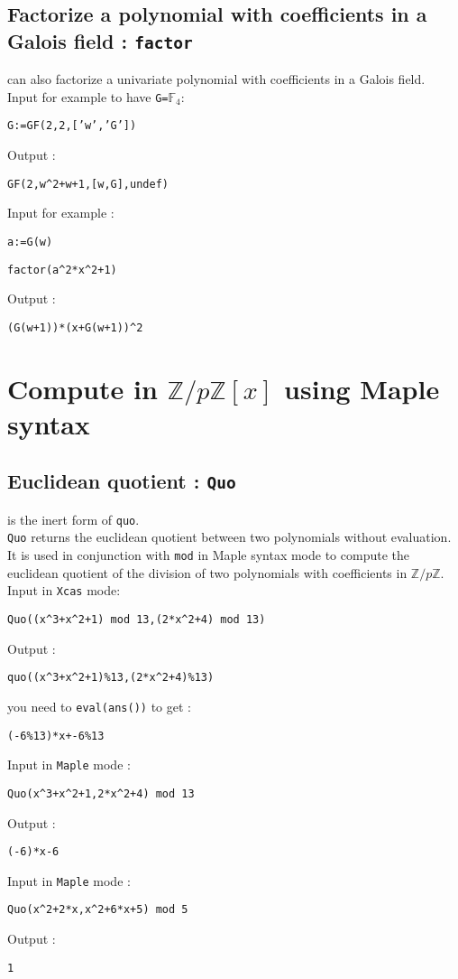 \documentclass[a4paper,11pt]{book}
\newcommand{\Z}{{\mathbb{Z}}}
\begin{document}
\subsection{Factorize a polynomial with coefficients in a Galois field : {\tt factor}}
 can also factorize a univariate
polynomial with coefficients in a Galois field.\\
Input for example to have {\tt G=}$\mathbb F_4$:\\
\begin{center}{\tt G:=GF(2,2,['w','G'])}\end{center}
Output :
\begin{center}{\tt GF(2,w\verb|^|2+w+1,[w,G],undef)}\end{center}
Input for example :
\begin{center}{\tt a:=G(w)}\end{center}
\begin{center}{\tt factor(a\verb|^|2*x\verb|^|2+1)}\end{center}
Output :
\begin{center}{\tt (G(w+1))*(x+G(w+1))\verb|^|2}\end{center}

\section{Compute in $\Z/p\Z[x]$ using Maple syntax}\index{\%}\label{sec:modulmap}
\subsection{Euclidean quotient : {\tt Quo}}
 is the inert form of {\tt quo}.\\
{\tt Quo} returns the euclidean quotient between two polynomials
 without evaluation.\\ 
It is used in conjunction with {\tt mod} in Maple syntax mode to compute
the euclidean quotient of the division of two
polynomials with coefficients in $\Z/p\Z$.\\
Input in {\tt Xcas} mode:
\begin{center}{\tt Quo((x\verb|^|3+x\verb|^|2+1) mod 13,(2*x\verb|^|2+4) mod 13)}\end{center}
Output :
\begin{center}{\tt quo((x\verb|^|3+x\verb|^|2+1)\%13,(2*x\verb|^|2+4)\%13)}\end{center}
you need to {\tt eval(ans())} to get :
\begin{center}{\tt (-6\%13)*x+-6\%13}\end{center}
Input in {\tt Maple} mode :
\begin{center}{\tt Quo(x\verb|^|3+x\verb|^|2+1,2*x\verb|^|2+4) mod 13}\end{center}
Output :
\begin{center}{\tt (-6)*x-6}\end{center}
Input in {\tt Maple} mode :
\begin{center}{\tt Quo(x\verb|^|2+2*x,x\verb|^|2+6*x+5) mod 5}\end{center}
Output :
\begin{center}{\tt 1}\end{center}
\end{document}
